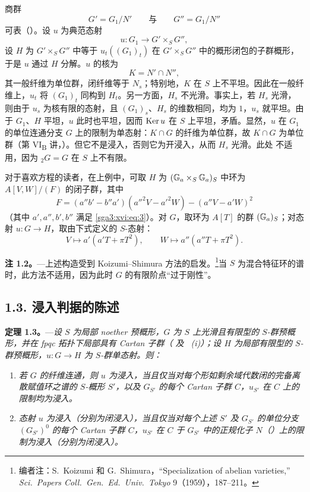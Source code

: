 商群
\[
  G'=G_1/N'
  \qquad\text{与}\qquad
  G''=G_1/N''
\]
可表（）。设 \(u\) 为典范态射
\[
  u:G_1\longrightarrow G'\times_S G'',
\]
设 \(H\) 为 \(G'\times_S G''\) 中等于 \(u_t((G_1)_t)\) 在 \(G'\times_S G''\) 中的概形闭包的子群概形，于是 \(u\) 通过 \(H\) 分解。\(u\) 的核为
\[
  K=N'\cap N'',
\]
其一般纤维为单位群，闭纤维等于 \(N_s\)；特别地，\(K\) 在 \(S\) 上不平坦。因此在一般纤维上，\(u_t\) 将 \((G_1)_t\) 同构到 \(H_t\)。另一方面，\(H_s\) 不光滑。事实上，若 \(H_s\) 光滑，则由于 \(u_s\) 为核有限的态射，且 \((G_1)_s\)、\(H_s\) 的维数相同，均为 \(1\)，\(u_s\) 就平坦。由于 \(G_1\)、\(H\) 平坦，\(u\) 此时也平坦，因而 \(\operatorname{Ker} u\) 在 \(S\) 上平坦，矛盾。显然，\(u\) 在 \(G_1\) 的单位连通分支 \(G\) 上的限制为单态射：\(K\cap G\) 的纤维为单位群，故 \(K\cap G\) 为单位群（第 VI\textsubscript{B} 讲，）。但它不是浸入，否则它为开浸入，从而 \(H_s\) 光滑。此处 不适用，因为 \({}_{2}G=G\) 在 \(S\) 上不有限。

对于喜欢方程的读者，在上例中，可取 \(H\) 为 \((\mathbb G_a\times_S\mathbb G_a)_S\) 中环为 \(A[V,W]/(F)\) 的闭子群，其中
\[
  F=(a''b'-b''a')(a''^2V-a'^2W)-(a''V-a'W)^2
\]
（其中 \(a',a'',b',b''\) 满足 \eqref{sga3:xvi:eq:3}）。对 \(G\)，取环为 \(A[T]\) 的群 \((\mathbb G_a)_S\)；对态射 \(u:G\to H\)，取由下式定义的 \(S\)-态射：
\[
  V\longmapsto a'(a'T+\pi T^2),
  \qquad
  W\longmapsto a''(a''T+\pi T^2).
\]

\medskip
\noindent{}%
\textbf{注 1.2。}---上述构造受到 Koizumi--Shimura 方法的启发。\footnote{编者注：S.~Koizumi 和 G.~Shimura，``Specialization of abelian varieties,'' \emph{Sci.\ Papers Coll.\ Gen.\ Ed.\ Univ.\ Tokyo} 9（1959），187--211。}当 \(S\) 为混合特征环的谱时，此方法不适用，因为此时 \(G\) 的有限阶点“过于刚性”。

%
\subsection*{1.3. 浸入判据的陈述}

\medskip
\noindent{}%
\textbf{定理 1.3。}---\textit{设 \(S\) 为局部 noether 预概形，\(G\) 为 \(S\) 上光滑且有限型的 \(S\)-群预概形，并在 fpqc 拓扑下局部具有 Cartan 子群（ 及 ~(i)）；设 \(H\) 为局部有限型的 \(S\)-群预概形，\(u:G\to H\) 为 \(S\)-群单态射。则：}
\begin{enumerate}
\item[\textit{a)}] \textit{若 \(G\) 的纤维连通，则 \(u\) 为浸入，当且仅当对每个形如剩余域代数闭的完备离散赋值环之谱的 \(S\)-概形 \(S'\)，以及 \(G_{S'}\) 的每个 Cartan 子群 \(C\)，\(u_{S'}\) 在 \(C\) 上的限制均为浸入。}
\item[\textit{b)}] \textit{态射 \(u\) 为浸入（分别为闭浸入），当且仅当对每个上述 \(S'\) 及 \(G_{S'}\) 的单位分支 \((G_{S'})^0\) 的每个 Cartan 子群 \(C\)，\(u_{S'}\) 在 \(C\) 于 \(G_{S'}\) 中的正规化子 \(N\)（）上的限制为浸入（分别为闭浸入）。}
\end{enumerate}

